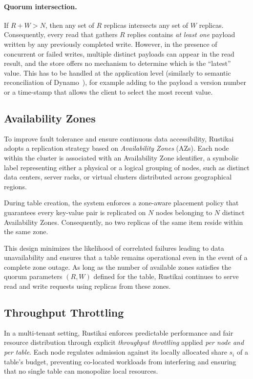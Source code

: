 \paragraph{Quorum intersection.}
If $R + W > N$, then any set of $R$ replicas intersects any set of $W$
replicas.
Consequently, every read that gathers $R$ replies contains \emph{at least one}
payload written by any previously completed write.
However, in the presence of concurrent or failed writes, multiple distinct
payloads can appear in the read result, and the store offers no mechanism to
determine which is the ``latest'' value.
This has to be handled at the application level (similarly to semantic
reconciliation of Dynamo~\cite{Dynamo2007}), for example adding to the payload
a version number or a time-stamp that allows the client to select the most
recent value.

\subsection{Availability Zones}
\label{subsec:availability-zones}

To improve fault tolerance and ensure continuous data accessibility, Rustikai
adopts a replication strategy based on \emph{Availability Zones} (AZs).
Each node within the cluster is associated with an Availability Zone
identifier, a symbolic label representing either a physical or a logical
grouping of nodes, such as distinct data centers, server racks, or virtual
clusters distributed across geographical regions.

During table creation, the system enforces a zone-aware placement policy that
guarantees every key-value pair is replicated on $N$ nodes belonging to $N$
distinct Availability Zones.
Consequently, no two replicas of the same item reside within the same zone.

This design minimizes the likelihood of correlated failures leading to data
unavailability and ensures that a table remains operational even in the event
of a complete zone outage.
As long as the number of available zones satisfies the quorum parameters $(R, W)$
defined for the table, Rustikai continues to serve read and write requests
using replicas from these zones.

\subsection{Throughput Throttling}
\label{subsec:throughput-throttling}

In a multi-tenant setting, Rustikai enforces predictable performance and fair
resource distribution through explicit \emph{throughput throttling} applied
\emph{per node and per table}.
Each node regulates admission against its locally allocated share $s_i$ of a
table's budget, preventing co-located workloads from interfering and ensuring
that no single table can monopolize local resources.

